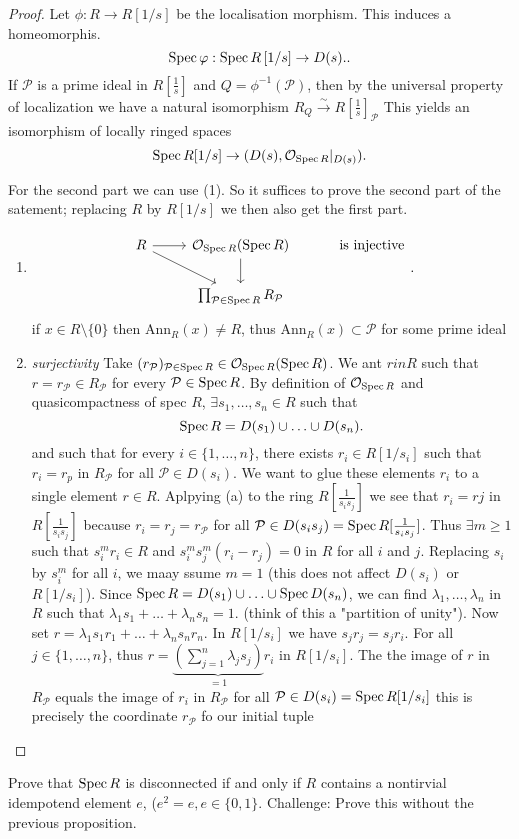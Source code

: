 \begin{proof}
	Let $\phi: R \to R[1 / s]$ be the localisation morphism. 
	This induces a homeomorphis. \[
		\operatorname{Spec} \varphi: \operatorname{Spec} R\left[1 / s\right] \to D(s). 
	.\] 
	If $\mathcal{P} $ is a prime ideal in $R[\frac{1}{s}]$ and $Q = \phi^{-1}(\mathcal{P} )$, then by the universal property of localization we have a natural isomorphism $R_Q \overset\sim\to R\left[ \frac{1}{s} \right] _{\mathcal{P} }$
	This yields an isomorphism of locally ringed spaces \[
		\operatorname{Spec} R[1 / s] \to (D(s), \mathcal{O} _{\operatorname{Spec} R}|_{D(s)})
	.\] 


	For the second part we can use (1). So it suffices to prove the second part of the satement; replacing $R$ by $R[1 / s]$ we then also get the first part. 
	\begin{enumerate}
		\item \[
		 \begin{tikzcd}
			 R \arrow[r] \arrow[dr] & \mathcal{O} _{\spec R}(\spec R) \arrow[d] & \text{ is injective}\\
				     & \prod_{\mathcal{P}  \in \spec R} R_{\mathcal{P} }
		 \end{tikzcd}
		.\] 
		if $x \in R \setminus \{0\} $ then $\text{Ann}_R(x) \ne R$, thus $\text{Ann}_R(x) \subset  \mathcal{P} $ for some prime ideal
	\item \emph{surjectivity}
		Take $(r_\mathcal{P} ) _{\mathcal{P}  \in \operatorname{Spec} R} \in \mathcal{O} _{\operatorname{Spec} R}(\operatorname{Spec} R)$. We ant $r in R$ such that $r = r_{\mathcal{P} } \in R_{\mathcal{P} }$ for every $\mathcal{P}  \in \operatorname{Spec} R$. 
		By definition of $\mathcal{O} _{\operatorname{Spec} R}$ and quasicompactness of spec $R$, $\exists s_1, \ldots, s_n \in R$ such that \[
			\operatorname{Spec} R = D(s_1) \cup  \ldots \cup D(s_n)
		.\] 
		and such that for every $i \in \{1, \ldots, n\} $, there exists $r_i \in R[1 / s_i]$ such that  $r_i = r_p$ in $R_\mathcal{P} $ for all $\mathcal{P}  \in D(s_i)$. 
		We want to glue these elements $r_i$ to a single element $r \in R$. 
		Aplpying (a) to the ring $R[\frac{1}{s_i s_j}]$ we see that $r_i = rj$ in $R[\frac{1}{s_i s_j}]$ because $r_i = r_j = r _{\mathcal{P} } $ for all $\mathcal{P}  \in D(s_i s_j) = \operatorname{Spec} R[\frac{1}{s_i s_j}]$. 
		Thus $\exists m \ge 1$ such that $s_i^{m}r_i \in R$ and $s_i^{m}s_j^{m}(r_i -r_j) = 0 $ in $R$ for all $i$ and $j$.
		Replacing $s_i$ by $s_i^{m}$ for all $i$, we maay ssume $m = 1$ (this does not affect $D(s_i)$ or $R[1 / s_i]$). 
		Since  $\operatorname{Spec} R = D(s_1) \cup \ldots\cup \operatorname{Spec} D(s_n)$, we can find $\lambda_1, \ldots, \lambda_n$ in $R$ such that $\lambda_1 s_1 + \ldots + \lambda_n s_n = 1$. 
		(think of this a "partition of unity"). 
		Now set $r = \lambda_1 s_1 r_1 + \ldots + \lambda_n s_n r_n$. 
		In $R[1 / s_i]$ we have  $s_j r_j = s_j r_i$. 
	For all $j \in \{1, \ldots, n\} $, thus $r = \underbrace{\left( \sum_{j = 1}^{n }\lambda_j s_j \right)}_{ = 1} r_i$ in $R[1 / s_i]$. 
	The the image of $r$ in $R_{\mathcal{P} }$ equals the image of $r_i$ in $R_\mathcal{P} $ for all $\mathcal{P}  \in D(s_i) = \operatorname{Spec} R[1 / s_i]$
	this is precisely the coordinate $r_\mathcal{P} $ fo our initial tuple
	\end{enumerate}
\end{proof}
\begin{exercise}
	Prove that $\operatorname{Spec} R$ is disconnected if and only if $R$ contains a nontirvial idempotend element $e$, ($e^2 = e, e \in \{0, 1\} $.
	Challenge: Prove this without the previous proposition.
\end{exercise}
